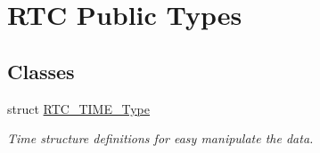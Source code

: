 \hypertarget{group___r_t_c___public___types}{\section{\-R\-T\-C \-Public \-Types}
\label{group___r_t_c___public___types}
}
\subsection*{\-Classes}
\begin{DoxyCompactItemize}
\item 
struct \hyperlink{struct_r_t_c___t_i_m_e___type}{\-R\-T\-C\-\_\-\-T\-I\-M\-E\-\_\-\-Type}
\begin{DoxyCompactList}\small\item\em \-Time structure definitions for easy manipulate the data. \end{DoxyCompactList}\end{DoxyCompactItemize}
